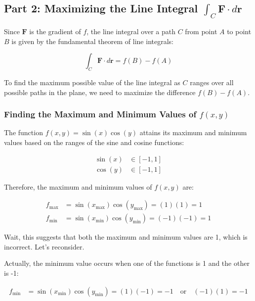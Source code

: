 \documentclass[11pt]{article}
\begin{document}
\newpage

\subsection{Part 2: Maximizing the Line Integral \(\displaystyle \int_{C} \mathbf{F} \cdot d\mathbf{r}\)}

Since \(\mathbf{F}\) is the gradient of \( f \), the line integral over a path \( C \) from point \( A \) to point \( B \) is given by the fundamental theorem of line integrals:

\[
\int_{C} \mathbf{F} \cdot d\mathbf{r} = f(B) - f(A)
\]

To find the maximum possible value of the line integral as \( C \) ranges over all possible paths in the plane, we need to maximize the difference \( f(B) - f(A) \).

\newpage

\subsubsection{Finding the Maximum and Minimum Values of \( f(x, y) \)}

The function \( f(x, y) = \sin(x) \cos(y) \) attains its maximum and minimum values based on the ranges of the sine and cosine functions:

\[
\begin{aligned}
\sin(x) &\in [-1, 1] \\
\cos(y) &\in [-1, 1]
\end{aligned}
\]

Therefore, the maximum and minimum values of \( f(x, y) \) are:

\[
\begin{aligned}
f_{\text{max}} &= \sin(x_{\text{max}}) \cos(y_{\text{max}}) = (1)(1) = 1 \\
f_{\text{min}} &= \sin(x_{\text{min}}) \cos(y_{\text{min}}) = (-1)(-1) = 1
\end{aligned}
\]

Wait, this suggests that both the maximum and minimum values are 1, which is incorrect. Let's reconsider.

Actually, the minimum value occurs when one of the functions is 1 and the other is -1:

\[
\begin{aligned}
f_{\text{min}} &= \sin(x_{\text{min}}) \cos(y_{\text{min}}) = (1)(-1) = -1 \quad \text{or} \quad (-1)(1) = -1
\end{aligned}
\]
\end{document}
